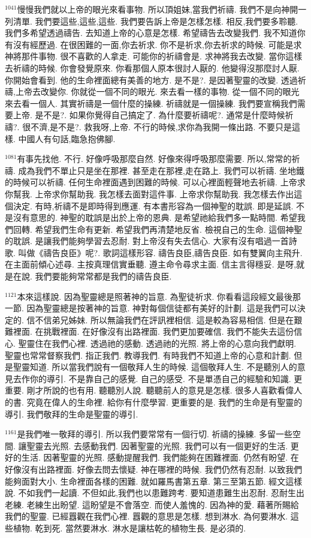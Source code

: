 \documentclass{book}
\begin{document}
$^{1041}$慢慢我們就以上帝的眼光來看事物.
所以頂姐妹,當我們祈禱.
我們不是向神開一列清單.
我們要這些,這些,這些.
我們要告訴上帝是怎樣怎樣.
相反,我們要多聆聽.
我們多希望透過禱告.
去知道上帝的心意是怎樣.
希望禱告去改變我們.
我不知道你有沒有經歷過.
在很困難的一面,你去祈求.
你不是祈求,你去祈求的時候.
可能是求神將那件事物.
很不喜歡的人拿走.
可能你的祈禱會是.
求神將我去改變.
當你這樣去祈禱的時候.
你會發覺原來.
你看那個人原本很討人厭的.
他變得沒那麼討人厭.
你開始會看到.
他的生命裡面總有美善的地方.
是不是?.
是因著聖靈的改變.
透過祈禱,上帝去改變你.
你就從一個不同的眼光.
來去看一樣的事物.
從一個不同的眼光來去看一個人.
其實祈禱是一個什麼的操練.
祈禱就是一個操練.
我們要宣稱我們需要上帝.
是不是?.
如果你覺得自己搞定了.
為什麼要祈禱呢?.
通常是什麼時候祈禱?.
很不濟,是不是?.
救我呀,上帝.
不行的時候,求你為我開一條出路.
不要只是這樣.
中國人有句話,臨急抱佛腳.

$^{1081}$有事先找他.
不行.
好像呼吸那麼自然.
好像來得呼吸那麼需要.
所以,常常的祈禱.
成為我們不單止只是坐在那裡.
甚至走在那裡,走在路上.
我們可以祈禱.
坐地鐵的時候可以祈禱.
任何生命裡面遇到困難的時候.
可以心裡面輕聲地去祈禱.
上帝求你幫我.
上帝求你幫助我.
我怎樣去面對這件事.
上帝求你幫助我.
我怎樣去作出這個決定.
有時,祈禱不是即時得到應運.
有本書形容為一個神聖的耽誤.
即是延誤.
不是沒有意思的.
神聖的耽誤是出於上帝的恩典.
是希望祂給我們多一點時間.
希望我們回轉.
希望我們生命有更新.
希望我們再清楚地反省.
檢視自己的生命.
這個神聖的耽誤.
是讓我們能夠學習去忍耐.
對上帝沒有失去信心.
大家有沒有唱過一首詩歌.
叫做《禱告良臣》呢?.
歌詞這樣形容.
禱告良臣,禱告良臣.
如有雙翼向主飛升.
在主面前傾心述尋.
主按真理信實垂聽.
遵主命令尋求主面.
信主言得穩妥.
是呀,就是在說.
我們要能夠常常都是我們的禱告良臣.

$^{1121}$本來這樣說.
因為聖靈總是照著神的旨意.
為聖徒祈求.
你看看這段經文最後那一節.
因為聖靈總是按著神的旨意.
神對每個信徒都有美好的計劃.
這是我們可以決定的.
信不信弟兄姊妹.
所以無論我們在評訊裡相信.
這是較為容易相信.
但是在艱難裡面.
在挑戰裡面.
在好像沒有出路裡面.
我們更加要確信.
我們不能失去這份信心.
聖靈住在我們心裡.
透過祂的感動.
透過祂的光照.
將上帝的心意向我們獻明.
聖靈也常常督察我們.
指正我們.
教導我們.
有時我們不知道上帝的心意和計劃.
但是聖靈知道.
所以當我們說有一個敬拜人生的時候.
這個敬拜人生.
不是聽別人的意見去作你的導引.
不是靠自己的感覺.
自己的感受.
不是單憑自己的經驗和知識.
更重要.
剛才所說的也有用.
聽聽別人說.
聽聽前人的意見是怎樣.
很多人喜歡看偉人的書.
究竟在偉人的生命裡.
給你有什麼學習.
更重要的是.
我們的生命是有聖靈的導引.
我們敬拜的生命是聖靈的導引.

$^{1161}$是我們唯一敬拜的導引.
所以我們要常常有一個行切.
祈禱的操練.
多留一些空間.
讓聖靈去光照.
去感動我們.
因著聖靈的光照.
我們可以有一個更好的生活.
更好的生活.
因著聖靈的光照.
感動提醒我們.
我們能夠在困難裡面.
仍然有盼望.
在好像沒有出路裡面.
好像去問去懷疑.
神在哪裡的時候.
我們仍然有忍耐.
以致我們能夠面對大小.
生命裡面各樣的困難.
就如羅馬書第五章.
第三至第五節.
經文這樣說.
不如我們一起讀.
不但如此,我們也以患難跨考.
要知道患難生出忍耐.
忍耐生出老練.
老練生出盼望.
這盼望是不會落空.
而使人羞愧的.
因為神的愛.
藉著所賜給我們的聖靈.
已經囂觀在我們心裡.
囂觀的意思是怎樣.
想到淋水.
為何要淋水.
這些植物.
乾到死.
當然要淋水.
淋水是讓枯乾的植物生長.
是必須的.
\end{document}
